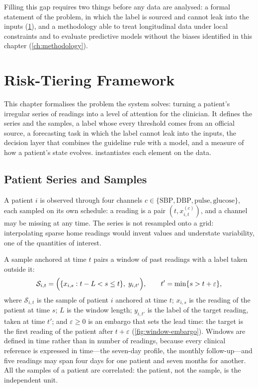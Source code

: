 \documentclass[11pt,a4paper,oneside]{report}
\begin{document}
Filling this gap requires two things before any data are analysed: a formal statement of the problem, in which the label is sourced and cannot leak into the inputs (\cref{ch:framework}), and a methodology able to treat longitudinal data under local constraints and to evaluate predictive models without the biases identified in this chapter (\cref{ch:methodology}).


\chapter{Risk-Tiering Framework}\label{ch:framework}

This chapter formalises the problem the system solves: turning a patient's irregular series of readings into a level of attention for the clinician. It defines the series and the samples, a label whose every threshold comes from an official source, a forecasting task in which the label cannot leak into the inputs, the decision layer that combines the guideline rule with a model, and a measure of how a patient's state evolves.  instantiates each element on the data.

\section{Patient Series and Samples}\label{sec:windows}\label{sec:irregular}

A patient $i$ is observed through four channels $c \in \{\mathrm{SBP}, \mathrm{DBP}, \text{pulse}, \text{glucose}\}$, each sampled on its own schedule: a reading is a pair $(t, x^{(c)}_{i,t})$, and a channel may be missing at any time. The series is not resampled onto a grid: interpolating sparse home readings would invent values and understate variability, one of the quantities of interest.

A sample anchored at time $t$ pairs a window of past readings with a label taken outside it:
\begin{equation}
  \mathcal{S}_{i,t} = \Bigl( \{x_{i,s} : t - L < s \leq t\},\; y_{i,t'} \Bigr),
  \qquad t' = \min\{ s > t + \varepsilon \},
\end{equation}
where $\mathcal{S}_{i,t}$ is the sample of patient $i$ anchored at time $t$; $x_{i,s}$ is the reading of the patient at time $s$; $L$ is the window length; $y_{i,t'}$ is the label of the target reading, taken at time $t'$; and $\varepsilon \geq 0$ is an embargo that sets the lead time: the target is the first reading of the patient after $t + \varepsilon$ (\cref{fig:window-embargo}). Windows are defined in time rather than in number of readings, because every clinical reference is expressed in time---the seven-day profile, the monthly follow-up---and five readings may span four days for one patient and seven months for another. All the samples of a patient are correlated: the patient, not the sample, is the independent unit.
\end{document}
